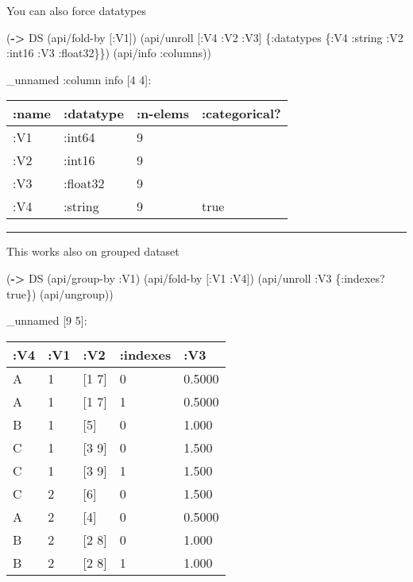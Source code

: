 \documentclass[]{article}
\newenvironment{Shaded}{\begin{snugshade}}{\end{snugshade}}
\newcommand{\AttributeTok}[1]{\textcolor[rgb]{0.77,0.63,0.00}{#1}}
\newcommand{\KeywordTok}[1]{\textcolor[rgb]{0.13,0.29,0.53}{\textbf{#1}}}
\newcommand{\NormalTok}[1]{#1}
\newcommand{\VariableTok}[1]{\textcolor[rgb]{0.00,0.00,0.00}{#1}}
\begin{document}
You can also force datatypes

\begin{Shaded}
\begin{Highlighting}[]
\NormalTok{(}\KeywordTok{->}\NormalTok{ DS}
\NormalTok{    (api/fold-by [}\AttributeTok{:V1}\NormalTok{])}
\NormalTok{    (api/unroll [}\AttributeTok{:V4} \AttributeTok{:V2} \AttributeTok{:V3}\NormalTok{] \{}\AttributeTok{:datatypes}\NormalTok{ \{}\AttributeTok{:V4} \AttributeTok{:string}
                                           \AttributeTok{:V2} \AttributeTok{:int16}
                                           \AttributeTok{:V3} \AttributeTok{:float32}\NormalTok{\}\})}
\NormalTok{    (api/info }\AttributeTok{:columns}\NormalTok{))}
\end{Highlighting}
\end{Shaded}

\_unnamed :column info {[}4 4{]}:

\begin{longtable}[]{@{}llll@{}}
\toprule
:name & :datatype & :n-elems & :categorical?\tabularnewline
\midrule
\endhead
:V1 & :int64 & 9 &\tabularnewline
:V2 & :int16 & 9 &\tabularnewline
:V3 & :float32 & 9 &\tabularnewline
:V4 & :string & 9 & true\tabularnewline
\bottomrule
\end{longtable}

\begin{center}\rule{0.5\linewidth}{0.5pt}\end{center}

This works also on grouped dataset

\begin{Shaded}
\begin{Highlighting}[]
\NormalTok{(}\KeywordTok{->}\NormalTok{ DS}
\NormalTok{    (api/group-by }\AttributeTok{:V1}\NormalTok{)}
\NormalTok{    (api/fold-by [}\AttributeTok{:V1} \AttributeTok{:V4}\NormalTok{])}
\NormalTok{    (api/unroll }\AttributeTok{:V3}\NormalTok{ \{}\AttributeTok{:indexes}\NormalTok{? }\VariableTok{true}\NormalTok{\})}
\NormalTok{    (api/ungroup))}
\end{Highlighting}
\end{Shaded}

\_unnamed {[}9 5{]}:

\begin{longtable}[]{@{}lllll@{}}
\toprule
:V4 & :V1 & :V2 & :indexes & :V3\tabularnewline
\midrule
\endhead
A & 1 & {[}1 7{]} & 0 & 0.5000\tabularnewline
A & 1 & {[}1 7{]} & 1 & 0.5000\tabularnewline
B & 1 & {[}5{]} & 0 & 1.000\tabularnewline
C & 1 & {[}3 9{]} & 0 & 1.500\tabularnewline
C & 1 & {[}3 9{]} & 1 & 1.500\tabularnewline
C & 2 & {[}6{]} & 0 & 1.500\tabularnewline
A & 2 & {[}4{]} & 0 & 0.5000\tabularnewline
B & 2 & {[}2 8{]} & 0 & 1.000\tabularnewline
B & 2 & {[}2 8{]} & 1 & 1.000\tabularnewline
\bottomrule
\end{longtable}
\end{document}
